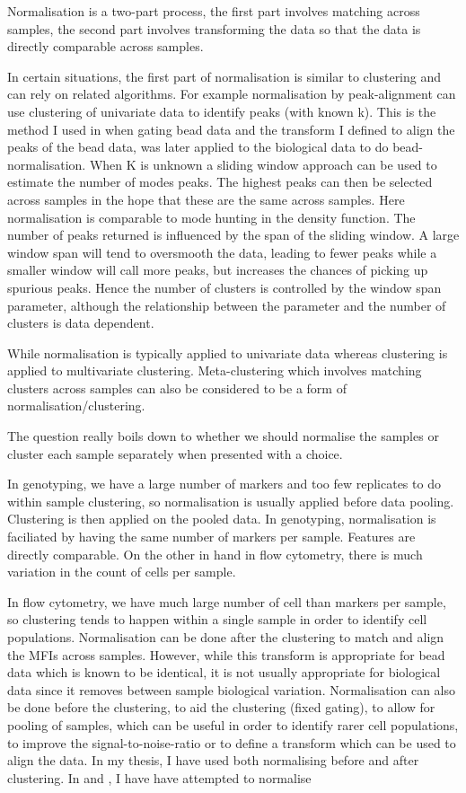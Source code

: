 Normalisation is a two-part process, the first part involves matching across samples,
the second part involves transforming the data so that the data is directly comparable across samples.

In certain situations,
the first part of normalisation is similar to clustering and can rely on related algorithms.
For example normalisation by peak-alignment can use clustering of univariate data to identify peaks (with known k).
This is the method I used in  when gating bead data and the transform I defined to align the peaks of the bead data,
was later applied to the biological data to do bead-normalisation.
When K is unknown a sliding window approach can be used to estimate the number of modes peaks.
The highest peaks can then be selected across samples in the hope that these are the same across samples.
Here normalisation is comparable to mode hunting in the density function.
The number of peaks returned is influenced by the span of the sliding window.
A large window span will tend to oversmooth the data, leading to fewer peaks while
a smaller window will call more peaks, but increases the chances of picking up spurious peaks.
Hence the number of clusters is controlled by the window span parameter, although the relationship between the parameter and the number of clusters is data dependent.

While normalisation is typically applied to univariate data whereas clustering is applied to multivariate clustering.
Meta-clustering which involves matching clusters across samples can also be considered to be a form of normalisation/clustering.

The question really boils down to whether we should normalise the samples or cluster each sample separately when presented with a choice.

In genotyping, we have a large number of markers and too few replicates to do within sample clustering, so normalisation is usually applied before data pooling.
Clustering is then applied on the pooled data.
In genotyping, normalisation is faciliated by having the same number of markers per sample.
Features are directly comparable.
On the other in hand in flow cytometry, there is much variation in the count of cells per sample.

In flow cytometry, we have much large number of cell than markers per sample,
so clustering tends to happen within a single sample in order to identify cell populations.
Normalisation can be done after the clustering to match and align the MFIs across samples.
However, while this transform is appropriate for bead data which is known to be identical,
it is not usually appropriate for biological data since it removes between sample biological variation.
Normalisation can also be done before the clustering, to aid the clustering (fixed gating),
to allow for pooling of samples, which can be useful in order to identify rarer cell populations,
to improve the signal-to-noise-ratio or to define a transform which can be used to align the data.
In my thesis, I have used both normalising before and after clustering.
In  and , I have have attempted to normalise

